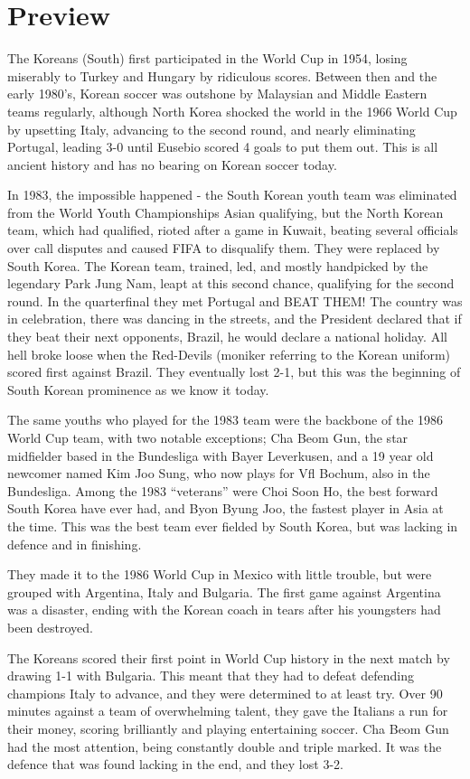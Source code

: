 \section{Preview}
The Koreans (South) first participated in the World Cup in 1954, losing 
miserably to Turkey and Hungary by ridiculous scores. Between then and the 
early 1980's, Korean soccer was outshone by Malaysian and Middle Eastern teams
regularly, although North Korea shocked the world in the 1966 World Cup by 
upsetting Italy, advancing to the second round, and nearly eliminating 
Portugal, leading 3-0 until Eusebio scored 4 goals to put them out. This is all
ancient history and has no bearing on Korean soccer today.

In 1983, the impossible happened - the South Korean youth team was eliminated 
from the World Youth Championships Asian qualifying, but the North Korean team,
which had qualified, rioted after a game in Kuwait, beating several officials
over call disputes and caused FIFA to disqualify them. They were replaced by
South Korea. The Korean team, trained, led, and mostly handpicked by the 
legendary Park Jung Nam, leapt at this second chance, qualifying for the second
round. In the quarterfinal they met Portugal and BEAT THEM! The country was in
celebration, there was dancing in the streets, and the President declared that
if they beat their next opponents, Brazil, he would declare a national holiday.
All hell broke loose when the Red-Devils (moniker referring to the Korean 
uniform) scored first against Brazil. They eventually lost 2-1, but this was 
the beginning of South Korean prominence as we know it today.

The same youths who played for the 1983 team were the backbone of the 1986 
World Cup team, with two notable exceptions; Cha Beom Gun, the star midfielder
based in the Bundesliga with Bayer Leverkusen, and a 19 year old newcomer named
Kim Joo Sung, who now plays for Vfl Bochum, also in the Bundesliga. Among the
1983 ``veterans'' were Choi Soon Ho, the best forward South Korea have ever had,
and Byon Byung Joo, the fastest player in Asia at the time. This was the best 
team ever fielded by South Korea, but was lacking in defence and in finishing.

They made it to the 1986 World Cup in Mexico with little trouble, but were 
grouped with Argentina, Italy and Bulgaria. The first game against Argentina
was a disaster, ending with the Korean coach in tears after his youngsters had 
been destroyed.

The Koreans scored their first point in World Cup history in the next match by
drawing 1-1 with Bulgaria. This meant that they had to defeat defending 
champions Italy to advance, and they were determined to at least try. Over 90
minutes against a team of overwhelming talent, they gave the Italians a run for
their money, scoring brilliantly and playing entertaining soccer. Cha Beom Gun
had the most attention, being constantly double and triple marked. It was the
defence that was found lacking in the end, and they lost 3-2.

